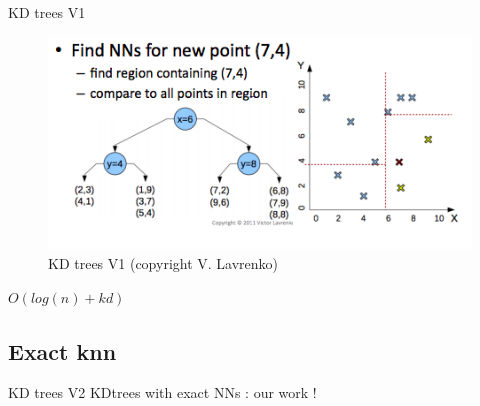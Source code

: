 \documentclass[11 pt]{beamer}
\begin{document}
\begin{frame}{KD trees V1}
\begin{figure}
	\centering
	\includegraphics[width=\textwidth]{figures/lavrenko.png}
	\caption{KD trees V1 (copyright V. Lavrenko)}
	\label{fig:lsh}
\end{figure}
$O(log(n)+kd)$
\end{frame}
%
\subsection{Exact knn}

\begin{frame}{KD trees V2}
\Large{\textrightarrow KDtrees with exact NNs : our work !}
\end{frame}
\end{document}

